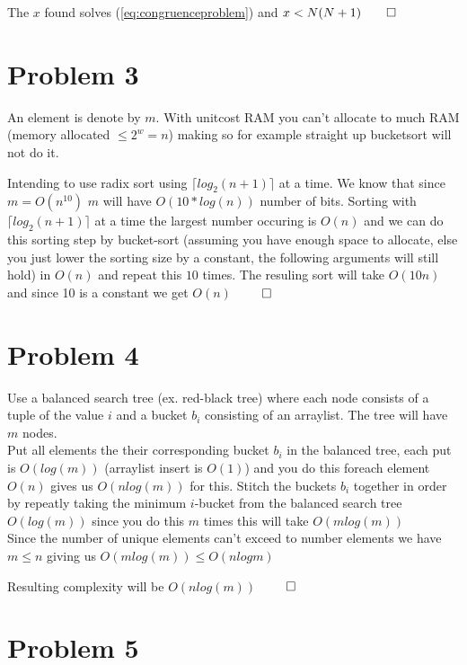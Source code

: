 \documentclass[a4paper,twoside=false,abstract=false,numbers=noenddot,
titlepage=false,headings=small,parskip=half,version=last]{scrartcl}
\begin{document}
The $x$ found solves (\ref{eq:congruenceproblem}) and $x<N(N+1) \qed$

\section{Problem 3}

An element is denote by $m$. With unitcost RAM you can't allocate to much RAM (memory allocated $\le 2^w=n$) making so for example straight up bucketsort will not do it.

Intending to use radix sort using $\lceil{log_2(n+1)}\rceil$ at a time. %
We know that since $m=O(n^{10})$ $m$ will have $O(10*log(n))$ number of bits.
Sorting with $\lceil{log_2(n+1)}\rceil$ at a time the largest number occuring is $O(n)$ and we can do this sorting step by bucket-sort (assuming you have enough space to allocate, else you just lower the sorting size by a constant, the following arguments will still hold) in $O(n)$ and repeat this $10$ times.
The resuling sort will take $O(10n)$ and since 10 is a constant we get $O(n)$ $\qed$

\section{Problem 4}

Use a balanced search tree (ex. red-black tree) where each node consists of a tuple of the value $i$ and a bucket $b_i$ consisting of an arraylist.
The tree will have $m$ nodes.\\
Put all elements the their corresponding bucket $b_i$ in the balanced tree, each put is $O(log(m))$ (arraylist insert is $O(1)$) and you do this foreach element $O(n)$ gives us $O(nlog(m))$ for this.
Stitch the buckets $b_i$ together in order by repeatly taking the minimum $i$-bucket from the balanced search tree $O(log(m))$ since you do this $m$ times this will take $O(mlog(m))$\\
Since the number of unique elements can't exceed to number elements we have $m \le n$ giving us $O(mlog(m)) \le O(nlogm)$

Resulting complexity will be $O(nlog(m))$ $\qed$

\section{Problem 5}
\end{document}
